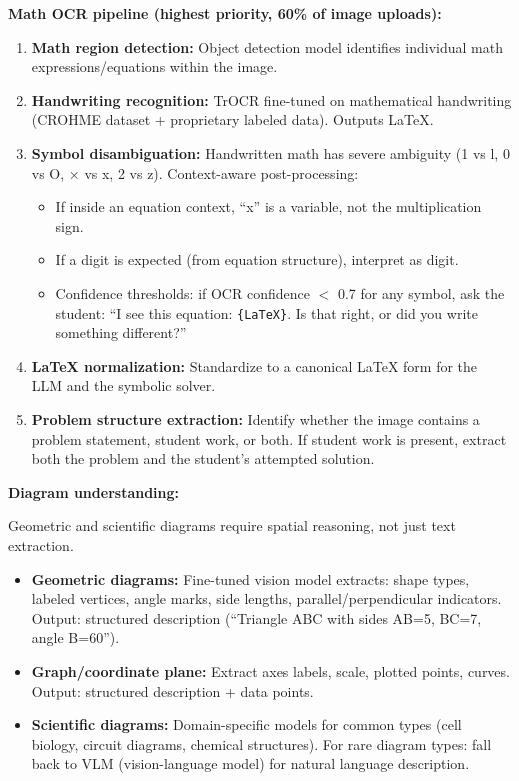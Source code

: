 \textbf{Math OCR pipeline (highest priority, 60\% of image uploads):}

\begin{enumerate}
  \item \textbf{Math region detection:} Object detection model identifies individual math expressions/equations within the image.
  \item \textbf{Handwriting recognition:} TrOCR fine-tuned on mathematical handwriting (CROHME dataset + proprietary labeled data). Outputs LaTeX.
  \item \textbf{Symbol disambiguation:} Handwritten math has severe ambiguity (1 vs l, 0 vs O, $\times$ vs x, 2 vs z). Context-aware post-processing:
  \begin{itemize}
    \item If inside an equation context, ``x'' is a variable, not the multiplication sign.
    \item If a digit is expected (from equation structure), interpret as digit.
    \item Confidence thresholds: if OCR confidence $<$ 0.7 for any symbol, ask the student: ``I see this equation: \texttt{\{LaTeX\}}. Is that right, or did you write something different?''
  \end{itemize}
  \item \textbf{LaTeX normalization:} Standardize to a canonical LaTeX form for the LLM and the symbolic solver.
  \item \textbf{Problem structure extraction:} Identify whether the image contains a problem statement, student work, or both. If student work is present, extract both the problem and the student's attempted solution.
\end{enumerate}

\textbf{Diagram understanding:}

Geometric and scientific diagrams require spatial reasoning, not just text extraction.

\begin{itemize}
  \item \textbf{Geometric diagrams:} Fine-tuned vision model extracts: shape types, labeled vertices, angle marks, side lengths, parallel/perpendicular indicators. Output: structured description (``Triangle ABC with sides AB=5, BC=7, angle B=60\textdegree'').
  \item \textbf{Graph/coordinate plane:} Extract axes labels, scale, plotted points, curves. Output: structured description + data points.
  \item \textbf{Scientific diagrams:} Domain-specific models for common types (cell biology, circuit diagrams, chemical structures). For rare diagram types: fall back to VLM (vision-language model) for natural language description.
\end{itemize}

